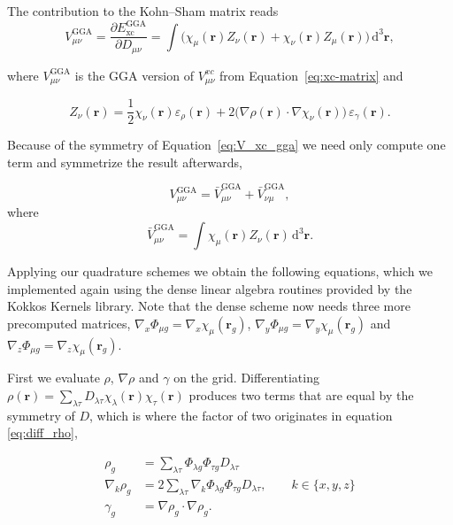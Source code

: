 \documentclass{article}
\begin{document}
The contribution to the Kohn--Sham matrix reads \cite{Stocks_2025}
\begin{equation}
  V_{\mu \nu }^{\text{GGA}} = \frac{\partial
  E_\text{xc}^{\text{GGA}}}{\partial D_{\mu \nu }} =
  \int \Big( \chi_\mu(\mathbf r) Z_\nu(\mathbf r) + \chi_\nu(\mathbf r)
  Z_\mu(\mathbf r) \Big)\, \mathrm d ^3 \mathbf r,
  \label{eq:V_xc_gga}
\end{equation}

where \(  V_{\mu \nu }^{\text{GGA}}\) is the GGA version of
\(V^{xc}_{\mu\nu}\) from Equation~\eqref{eq:xc-matrix} and

\begin{equation}
  Z_\nu(\mathbf r) = \frac{1}{2} \chi_\nu(\mathbf r)
  \varepsilon_\rho(\mathbf r) + 2\big(\nabla \rho(\mathbf r)
  \cdot \nabla \chi_\nu(\mathbf r)\big)\, \varepsilon_\gamma(\mathbf r).
  \label{eq:Z_gga}
\end{equation}

Because of the symmetry of Equation~\eqref{eq:V_xc_gga} we need only
compute one term and symmetrize the result afterwards,

\begin{equation}
  V_{\mu \nu }^{\text{GGA}} = \bar V_{\mu \nu }^{\text{GGA}} +
  \bar V_{\nu \mu }^{\text{GGA}},
\end{equation}
where
\begin{equation}
  \bar V_{\mu \nu }^{\text{GGA}} = \int \chi_\mu(\mathbf r)
  Z_\nu(\mathbf r)\,  \mathrm d ^3 \mathbf r.
\end{equation}

Applying our quadrature schemes we obtain the following equations,
which we implemented again using the dense linear algebra routines
provided by the Kokkos Kernels library. Note that the dense scheme now
needs three more precomputed matrices,
\( \nabla_x\Phi_{\mu g} = \nabla_x\chi_{\mu}(\mathbf r_g) \),
\( \nabla_y\Phi_{\mu g} = \nabla_y\chi_{\mu}(\mathbf r_g) \) and
\( \nabla_z\Phi_{\mu g} = \nabla_z\chi_{\mu}(\mathbf r_g) \).

First we evaluate \( \rho \), \( \nabla\rho \) and \( \gamma  \) on the
grid. Differentiating \( \rho(\mathbf r) = \sum_{\lambda \tau}
D_{\lambda \tau}\chi_\lambda(\mathbf r)\chi_\tau(\mathbf r) \) produces
two terms that are equal by the symmetry of \( D \), which is where the
factor of two originates in equation \eqref{eq:diff_rho},

\begin{align}
  \rho_g &= \sum_{\lambda  \tau } \Phi_{\lambda g} \Phi_{\tau g}
  D_{\lambda  \tau}  \\
  \nabla_k\rho_g &= 2\sum_{\lambda  \tau } \nabla_k\Phi_{\lambda g}
  \Phi_{\tau g} D_{\lambda  \tau}, \qquad k \in \{x,y,z\} \label{eq:diff_rho} \\
  \gamma_g &= \nabla\rho_g \cdot \nabla\rho_g .
\end{align}
\end{document}

